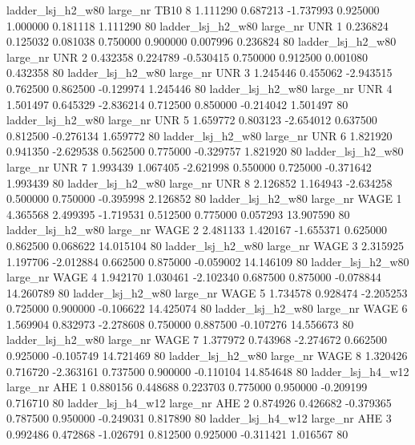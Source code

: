   ladder_lsj_h2_w80   large_nr     TB10                 8  1.111290  0.687213  -1.737993 0.925000 1.000000  0.181118    1.111290 80
  ladder_lsj_h2_w80   large_nr      UNR                 1  0.236824  0.125032   0.081038 0.750000 0.900000  0.007996    0.236824 80
  ladder_lsj_h2_w80   large_nr      UNR                 2  0.432358  0.224789  -0.530415 0.750000 0.912500  0.001080    0.432358 80
  ladder_lsj_h2_w80   large_nr      UNR                 3  1.245446  0.455062  -2.943515 0.762500 0.862500 -0.129974    1.245446 80
  ladder_lsj_h2_w80   large_nr      UNR                 4  1.501497  0.645329  -2.836214 0.712500 0.850000 -0.214042    1.501497 80
  ladder_lsj_h2_w80   large_nr      UNR                 5  1.659772  0.803123  -2.654012 0.637500 0.812500 -0.276134    1.659772 80
  ladder_lsj_h2_w80   large_nr      UNR                 6  1.821920  0.941350  -2.629538 0.562500 0.775000 -0.329757    1.821920 80
  ladder_lsj_h2_w80   large_nr      UNR                 7  1.993439  1.067405  -2.621998 0.550000 0.725000 -0.371642    1.993439 80
  ladder_lsj_h2_w80   large_nr      UNR                 8  2.126852  1.164943  -2.634258 0.500000 0.750000 -0.395998    2.126852 80
  ladder_lsj_h2_w80   large_nr     WAGE                 1  4.365568  2.499395  -1.719531 0.512500 0.775000  0.057293   13.907590 80
  ladder_lsj_h2_w80   large_nr     WAGE                 2  2.481133  1.420167  -1.655371 0.625000 0.862500  0.068622   14.015104 80
  ladder_lsj_h2_w80   large_nr     WAGE                 3  2.315925  1.197706  -2.012884 0.662500 0.875000 -0.059002   14.146109 80
  ladder_lsj_h2_w80   large_nr     WAGE                 4  1.942170  1.030461  -2.102340 0.687500 0.875000 -0.078844   14.260789 80
  ladder_lsj_h2_w80   large_nr     WAGE                 5  1.734578  0.928474  -2.205253 0.725000 0.900000 -0.106622   14.425074 80
  ladder_lsj_h2_w80   large_nr     WAGE                 6  1.569904  0.832973  -2.278608 0.750000 0.887500 -0.107276   14.556673 80
  ladder_lsj_h2_w80   large_nr     WAGE                 7  1.377972  0.743968  -2.274672 0.662500 0.925000 -0.105749   14.721469 80
  ladder_lsj_h2_w80   large_nr     WAGE                 8  1.320426  0.716720  -2.363161 0.737500 0.900000 -0.110104   14.854648 80
  ladder_lsj_h4_w12   large_nr      AHE                 1  0.880156  0.448688   0.223703 0.775000 0.950000 -0.209199    0.716710 80
  ladder_lsj_h4_w12   large_nr      AHE                 2  0.874926  0.426682  -0.379365 0.787500 0.950000 -0.249031    0.817890 80
  ladder_lsj_h4_w12   large_nr      AHE                 3  0.992486  0.472868  -1.026791 0.812500 0.925000 -0.311421    1.016567 80
